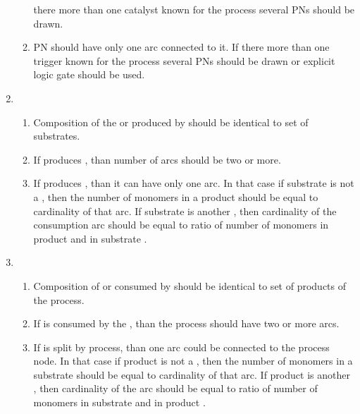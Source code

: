 \begin{enumerate}
\begin{enumerate}
    there more than one catalyst known for the process several PNs should be
    drawn. 
    \item PN should have only one  arc connected to it. If
    there more than one trigger known for the process several PNs should be
    drawn or explicit logic gate should be used.  
  \end{enumerate}  
    \item {}
  \begin{enumerate}
    \item Composition of the  or  produced by
     should be identical to set of  substrates.
    \item If  produces , than number of 
     arcs should be two or more.
    \item If  produces , than it can have only one 
     arc. In that case if substrate is not a
    , then the number of monomers in a product 
    should be equal to cardinality of that arc. If substrate is another
    , then cardinality of the consumption arc should be equal to
    ratio of number of monomers in product and in substrate .
  \end{enumerate}  
    \item {}
  \begin{enumerate}
    \item Composition of  or  consumed by
     should be identical to set of products of the process.
    \item If  is consumed by the , than the
    process should have two or more  arcs.
    \item If  is split by  process, than
    one  arc could be connected to the process node. In that case if product is not a
    , then the number of monomers in a substrate 
    should be equal to cardinality of that arc. If product is another
    , then cardinality of the  arc should be equal to
    ratio of number of monomers in substrate and in product .
  \end{enumerate}  
  
  
\end{enumerate}


